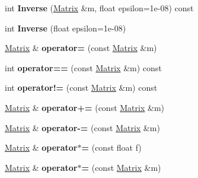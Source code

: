 \begin{DoxyCompactItemize}
\item 
\hypertarget{classMatrix_a84db3b710d89b69bf7fe5c019185fbbb}{int {\bfseries \-Inverse} (\hyperlink{classMatrix}{\-Matrix} \&m, float epsilon=1e-\/08) const }\label{classMatrix_a84db3b710d89b69bf7fe5c019185fbbb}

\item 
\hypertarget{classMatrix_af203ab3d087288d9eb6e84afe5814fa9}{int {\bfseries \-Inverse} (float epsilon=1e-\/08)}\label{classMatrix_af203ab3d087288d9eb6e84afe5814fa9}

\item 
\hypertarget{classMatrix_aea5a06385f646eb4a63929fae6fa3e14}{\hyperlink{classMatrix}{\-Matrix} \& {\bfseries operator=} (const \hyperlink{classMatrix}{\-Matrix} \&m)}\label{classMatrix_aea5a06385f646eb4a63929fae6fa3e14}

\item 
\hypertarget{classMatrix_a3907074da7d66966da2ae99413d1c3bf}{int {\bfseries operator==} (const \hyperlink{classMatrix}{\-Matrix} \&m) const }\label{classMatrix_a3907074da7d66966da2ae99413d1c3bf}

\item 
\hypertarget{classMatrix_a7677246e5e4d8350758f4f651dc87c90}{int {\bfseries operator!=} (const \hyperlink{classMatrix}{\-Matrix} \&m) const }\label{classMatrix_a7677246e5e4d8350758f4f651dc87c90}

\item 
\hypertarget{classMatrix_a2780b459599c6ba0b4c63ce6ca6c1ba9}{\hyperlink{classMatrix}{\-Matrix} \& {\bfseries operator+=} (const \hyperlink{classMatrix}{\-Matrix} \&m)}\label{classMatrix_a2780b459599c6ba0b4c63ce6ca6c1ba9}

\item 
\hypertarget{classMatrix_a26bb57b9a95c3c5ddcb6dfe4de089f04}{\hyperlink{classMatrix}{\-Matrix} \& {\bfseries operator-\/=} (const \hyperlink{classMatrix}{\-Matrix} \&m)}\label{classMatrix_a26bb57b9a95c3c5ddcb6dfe4de089f04}

\item 
\hypertarget{classMatrix_a2db81df6efad774392a12384f7c2cf26}{\hyperlink{classMatrix}{\-Matrix} \& {\bfseries operator$\ast$=} (const float f)}\label{classMatrix_a2db81df6efad774392a12384f7c2cf26}

\item 
\hypertarget{classMatrix_a4680eaaf820efafb0017a2ee593bea8c}{\hyperlink{classMatrix}{\-Matrix} \& {\bfseries operator$\ast$=} (const \hyperlink{classMatrix}{\-Matrix} \&m)}\label{classMatrix_a4680eaaf820efafb0017a2ee593bea8c}


\end{DoxyCompactItemize}
